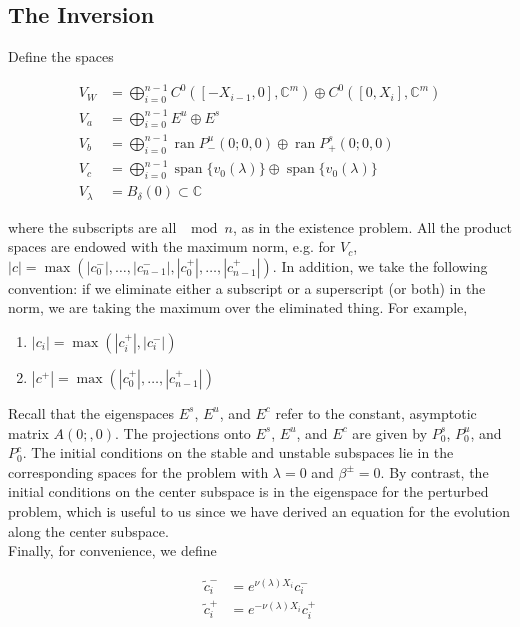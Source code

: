 \documentclass[12pt]{article}
\def\C{{\mathbb C}}
\DeclareMathOperator{\spn}{span}
\DeclareMathOperator{\ran}{ran}
\begin{document}
\subsection{The Inversion}

Define the spaces

\begin{align*}
V_W &= \bigoplus_{i=0}^{n-1} C^0([-X_{i-1}, 0], \C^m) \oplus C^0([0, X_i], \C^m) \\
V_a &= \bigoplus_{i=0}^{n-1} E^u \oplus E^s\\
V_b &= \bigoplus_{i=0}^{n-1} \ran P^u_-(0; 0, 0) \oplus \ran P^s_+(0; 0, 0) \\
V_c &= \bigoplus_{i=0}^{n-1} \spn \{v_0(\lambda)\} \oplus \spn \{v_0(\lambda)\} \\
V_\lambda &= B_\delta(0) \subset \C
\end{align*}

where the subscripts are all $\mod n$, as in the existence problem. All the product spaces are endowed with the maximum norm, e.g. for $V_c$, $|c| = \max(|c_0^-|, \dots, |c_{n-1}^-|, |c_0^+|, \dots, |c_{n-1}^+|)$. In addition, we take the following convention: if we eliminate either a subscript or a superscript (or both) in the norm, we are taking the maximum over the eliminated thing. For example,
\begin{enumerate}
	\item $|c_i| = \max(|c_i^+|, |c_i^-|)$ 
	\item $|c^+| = \max(|c_0^+|, \dots, |c_{n-1}^+|)$
\end{enumerate} 

Recall that the eigenspaces $E^s$, $E^u$, and $E^c$ refer to the constant, asymptotic matrix $A(0;, 0)$. The projections onto $E^s$, $E^u$, and $E^c$ are given by $P_0^s$, $P_0^u$, and $P_0^c$. The initial conditions on the stable and unstable subspaces lie in the corresponding spaces for the problem with $\lambda = 0$ and $\beta^\pm = 0$. By contrast, the initial conditions on the center subspace is in the eigenspace for the perturbed problem, which is useful to us since we have derived an equation for the evolution along the center subspace.\\

Finally, for convenience, we define

\begin{align*}
\tilde{c}_i^- &= e^{\nu(\lambda)X_i} c_i^- \\
\tilde{c}_i^+ &= e^{-\nu(\lambda)X_i} c_i^+
\end{align*}
\end{document}

